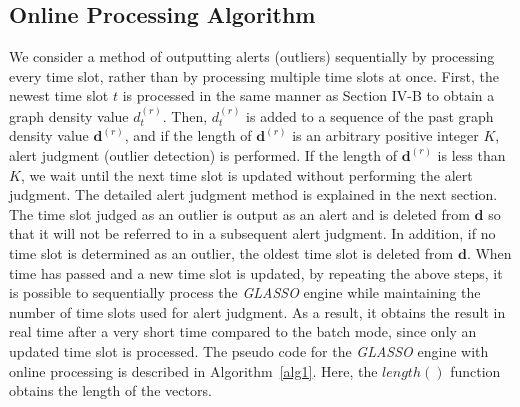 \documentclass[conference]{IEEEtran}
\begin{document}
\subsection{Online Processing Algorithm}
We consider a method of outputting alerts (outliers) sequentially by processing every time slot, rather than by processing multiple time slots at once.
First, the newest time slot $t$ is processed in the same manner as Section I\hspace{-.1em}V-B to obtain a graph density value $d_t^{(r)}$.
Then, $d_t^{(r)}$ is added to a sequence of the past graph density value $\bm{d}^{(r)}$, and if the length of $\bm{d}^{(r)}$ is an arbitrary positive integer $K$, alert judgment (outlier detection) is performed.
If the length of $\bm{d}^{(r)}$ is less than $K$, we wait until the next time slot is updated without performing the alert judgment.
The detailed alert judgment method is explained in the next section.
The time slot judged as an outlier is output as an alert and is deleted from $\bm{d}$ so that it will not be referred to in a subsequent alert judgment.
In addition, if no time slot is determined as an outlier, the oldest time slot is deleted from $\bm{d}$.
When time has passed and a new time slot is updated, by repeating the above steps, it is possible to sequentially process the {\it GLASSO} engine while maintaining the number of time slots used for alert judgment.
As a result, it obtains the result in real time after a very short time compared to the batch mode, since only an updated time slot is processed.
The pseudo code for the {\it GLASSO} engine with online processing is described in Algorithm~\ref{alg1}.
Here, the $length()$ function obtains the length of the vectors.


\end{document}
